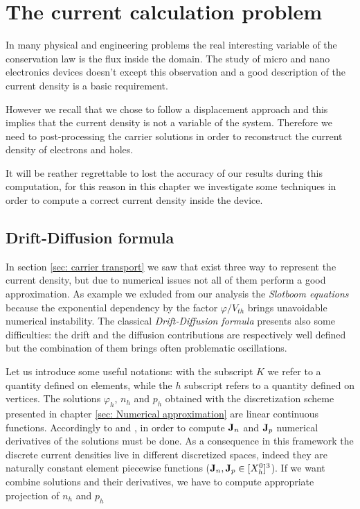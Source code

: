 \chapter{The current calculation problem}

In many physical and engineering problems the real interesting variable of the conservation law is the flux inside the domain. The study of micro and nano electronics devices doesn't except this observation and a good description of the current density is a basic requirement.

However we recall that we chose to follow a displacement approach and this implies that the current density is not a variable of the system. Therefore we need to post-processing the carrier solutions in order to reconstruct the current density of electrons and holes.

It will be reather regrettable to lost the accuracy of our results during this computation, for this reason in this chapter we investigate some techniques in order to compute a correct current density inside the device.



\section{Drift-Diffusion formula}

In section \ref{sec: carrier transport} we saw that exist three way to represent the current density, but due to numerical issues not all of them perform a good approximation. As example we exluded from our analysis the \textit{Slotboom equations}   because  the exponential dependency by the factor $\varphi / V_{th}$ brings unavoidable numerical instability. 
The classical \textit{Drift-Diffusion formula}   presents also some difficulties: the drift and the diffusion contributions are respectively well defined but the combination of them brings often problematic oscillations.

Let us introduce some useful notations: with the subscript $K$  we refer to a quantity defined on elements, while the $h$ subscript refers to a quantity defined on vertices. The solutions $\varphi_h$, $n_h$ and $p_h$ obtained with the discretization scheme presented in chapter \ref{sec: Numerical approximation} are linear continuous functions. Accordingly to   and ,  in order to compute $\mathbf{J}_n$ and $\mathbf{J}_p$ numerical derivatives of the solutions must be done. As a consequence in this framework the discrete current densities live in different discretized spaces, indeed they are naturally constant element piecewise functions ($\mathbf{J}_{n},\mathbf{J}_{p} \in [X_h^0]^3$). If we want combine solutions and their derivatives, we have to compute appropriate projection of $n_h$ and $p_h$
 
